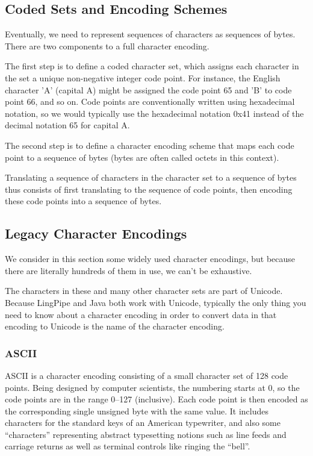 \subsection{Coded Sets and Encoding Schemes}

Eventually, we need to represent sequences of characters as sequences
of bytes.  There are two components to a full character encoding.

The first step is to define a coded character set, which assigns each
character in the set a unique non-negative integer code point.  For
instance, the English character 'A' (capital A) might be assigned the
code point 65 and 'B' to code point 66, and so on.  Code points are
conventionally written using hexadecimal notation, so we would
typically use the hexadecimal notation 0x41 instead of the decimal
notation 65 for capital A.

The second step is to define a character encoding scheme that maps
each code point to a sequence of bytes (bytes are often called octets
in this context).

Translating a sequence of characters in the character set to a
sequence of bytes thus consists of first translating to the sequence
of code points, then encoding these code points into a sequence of
bytes.


\subsection{Legacy Character Encodings}

We consider in this section some widely used character encodings, but
because there are literally hundreds of them in use, we can't be
exhaustive.  

The characters in these and many other character sets are part of
Unicode.  Because LingPipe and Java both work with Unicode, typically
the only thing you need to know about a character encoding in order
to convert data in that encoding to Unicode is the name of the
character encoding.

\subsubsection{ASCII}

ASCII is a character encoding consisting of a small character set of
128 code points.  Being designed by computer scientists, the numbering
starts at 0, so the code points are in the range 0--127 (inclusive).
Each code point is then encoded as the corresponding single unsigned
byte with the same value.  It includes characters for the standard
keys of an American typewriter, and also some ``characters''
representing abstract typesetting notions such as line feeds and
carriage returns as well as terminal controls like ringing the
``bell''.

